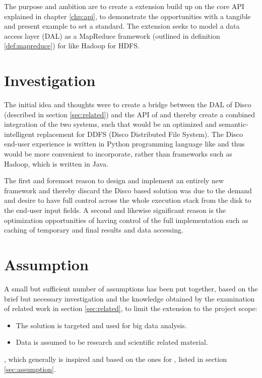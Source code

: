 The purpose and ambition are to create a \CodeName extension build up on the core API explained in chapter \ref{chp:api}, to demonstrate the opportunities with a tangible and present example to set a standard. The extension seeks to model a data access layer (DAL) as a MapReduce framework (outlined in definition \ref{def:mapreduce}) for \CodeName like Hadoop for HDFS.

\section{Investigation}
The initial idea and thoughts were to create a bridge between the DAL of Disco (described in section \ref{sec:related}) and the API of \CodeName and thereby create a combined integration of the two systems, such that \CodeName would be an optimized and semantic-intelligent replacement for DDFS (Disco Distributed File System). The Disco end-user experience is written in Python programming language like \CodeName and thus would be more convenient to incorporate, rather than frameworks such as Hadoop, which is written in Java.
\newline

The first and foremost reason to design and implement an entirely new framework and thereby discard the Disco based solution was due to the demand and desire to have full control across the whole execution stack from the disk to the end-user input fields. A second and likewise significant reason is the optimization opportunities of having control of the full implementation such as caching of temporary and final results and data accessing.

\section{Assumption}
A small but sufficient number of assumptions has been put together, based on the brief but necessary investigation and the knowledge obtained by the examination of related work in section \ref{sec:related}, to limit the extension to the project scope:

\begin{itemize}
	\item The solution is targeted and used for big data analysis.	
	\item Data is assumed to be research and scientific related material. 
\end{itemize}
, which generally is inspired and based on the ones for \CodeNameShort, listed in section \ref{sec:assumption}.
\newline

